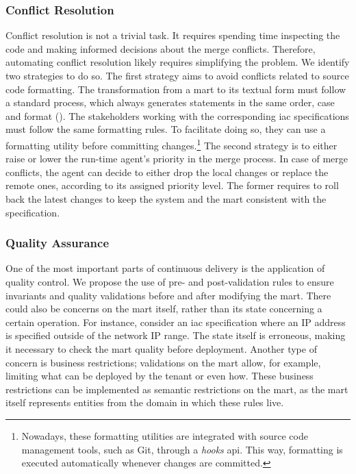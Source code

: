 \subsubsection{Conflict Resolution}

Conflict resolution is not a trivial task. It requires spending time inspecting the code and making informed decisions about the merge conflicts. Therefore, automating conflict resolution likely requires simplifying the problem. We identify two strategies to do so. The first strategy aims to avoid conflicts related to source code formatting. The transformation from a \gls{mart} to its textual form must follow a standard process, which always generates statements in the same order, case and format (). The stakeholders working with the corresponding \gls{iac} specifications must follow the same formatting rules. To facilitate doing so, they can use a formatting utility before committing changes.\footnote{Nowadays, these formatting utilities are integrated with source code management tools, such as Git, through a \emph{hooks} \gls{api}. This way, formatting is executed automatically whenever changes are committed.} The second strategy is to either raise or lower the run-time agent's priority in the merge process. In case of merge conflicts, the agent can decide to either drop the local changes or replace the remote ones, according to its assigned priority level. The former requires to roll back the latest changes to keep the system and the \gls{mart} consistent with the specification.

\subsubsection{Quality Assurance}

One of the most important parts of continuous delivery is the application of quality control. We propose the use of pre- and post-validation rules to ensure invariants and quality validations before and after modifying the \gls{mart}. There could also be concerns on the \gls{mart} itself, rather than its state concerning a certain operation. For instance, consider an \gls{iac} specification where an IP address is specified outside of the network IP range. The state itself is erroneous, making it necessary to check the \gls{mart} quality before deployment. Another type of concern is business restrictions; validations on the \gls{mart} allow, for example, limiting what can be deployed by the tenant or even how. These business restrictions can be implemented as semantic restrictions on the \gls{mart}, as the \gls{mart} itself represents entities from the domain in which these rules live.

